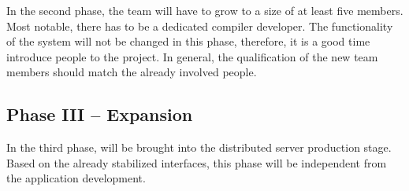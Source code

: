 \documentclass[a4paper, 10pt]{book}
\begin{document}
                                        In the second phase, the team will have to grow to a size of at least
                                        five members. Most notable, there has to be a dedicated compiler
                                        developer. The functionality of the system will not be changed in this
                                        phase, therefore, it is a good time introduce people to the
                                        project. In general, the qualification of the new team members
                                        should match the already involved people.


                                        \subsection{Phase III -- Expansion}

                                        In the third phase, \SYNEIGHT will be brought into the distributed server
                                        production stage. Based on the already stabilized interfaces, this
                                        phase will be independent from the application development. 
\end{document}
